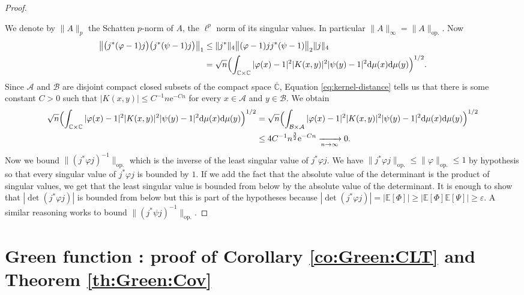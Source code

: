 \documentclass[10pt,reqno]{amsart}
\numberwithin{equation}{section}
\numberwithin{figure}{section}
\theoremstyle{plain}
\newcommand{\<}{\langle}
\renewcommand{\>}{\rangle}
\begin{document}
\begin{proof}
\begin{itemize}
	\end{itemize}
    We denote by $\|A\|_p$ the Schatten $p$-norm of $A$, the $\ell^p$ norm of its singular values. In particular $\|A\|_\infty=\|A\|_{\mathrm{op.}}$. 
    Now
	\begin{align}
    \big\|\big( j^* (\varphi  - 1) j\big)
	\big( j^* (\psi  - 1) j\big) \big\|_1
	&\leq \|j^*\|_4
	\big\|(\varphi  - 1) j
	 j^* (\psi  - 1)  \big\|_2 \|j\|_4 \\
	 &= \sqrt n
	 \Bigl(\int_{\mathbb C \times \mathbb C}
	 |\varphi(x) - 1|^2 |K(x,y)|^2 |\psi(y) - 1|^2 \mathrm d \mu(x) \mathrm d \mu(y)\Bigr)^{1/2}.
	  \end{align}
	Since $\mathcal{A}$ and $\mathcal{B}$ are disjoint compact
	closed subsets of the compact space $\overline{\mathbb C}$,
    Equation
	\eqref{eq:kernel-distance} tells us that there is some constant $C>0$
	such that $|K(x,y)| \leq C^{-1} n \mathrm{e}^{- C n}$ for every $x \in \mathcal{A}$ and $y \in \mathcal{B}$.
	We obtain
	\begin{align*}
		\sqrt n
	\Bigl(\int_{\mathbb C \times \mathbb C}
	|\varphi(x) - 1|^2 |K(x,y)|^2 |\psi(y) - 1|^2 \mathrm d \mu(x) \mathrm d \mu(y)\Bigr)^{1/2}
	&=
	\sqrt n
	\Bigl(\int_{\mathcal{B} \times \mathcal{A}}
	|\varphi(x) - 1|^2 |K(x,y)|^2 |\psi(y) - 1|^2 \mathrm d \mu(x) \mathrm d \mu(y)\Bigr)^{1/2}				\\
	& \leq  4C^{-1}n^{\frac{3}{2}} \mathrm{e}^{-Cn} 	 \xrightarrow[n \to \infty]{} 0 .
	\end{align*}
	Now we bound $\|(j^* \varphi j)^{-1}\|_{\mathrm{op.}} $ which is
	the inverse of the least singular value of $j^*\varphi j$.
	We have $\|j^* \varphi j\|_{\mathrm{op.}}
	\leq \|\varphi \|_{\mathrm{op.}} \leq 1$ by hypothesis 
	so that every singular value of $j^* \varphi j$ is  bounded by $1$.
	If we add the fact that the absolute value of the determinant
	is the product of singular values,
	we get that the least singular value is bounded from below by the absolute value
	of the determinant.
	It is enough to show that $|\det(j^* \varphi j)|$ is bounded from below
	but this is part of the hypotheses because
	$|\det(j^* \varphi j)| = |\mathbb E[\Phi]| 
    \geq 
    |\mathbb E[\Phi]\mathbb E[\Psi]| \geq \varepsilon $. A similar reasoning works
	to bound $\|(j^* \psi j)^{-1}\|_{\mathrm{op.}} $. %
  \end{proof}

\section{Green function : proof of Corollary \ref{co:Green:CLT} and Theorem \ref{th:Green:Cov}}
\label{se:proof:Green}
\end{document}
